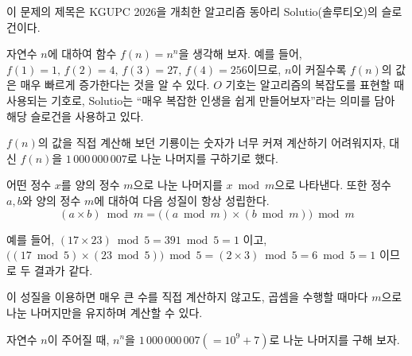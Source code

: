이 문제의 제목은 KGUPC 2026을 개최한 알고리즘 동아리 Solutio(솔루티오)의 슬로건이다.

자연수 $n$에 대하여 함수 $f(n)=n^n$을 생각해 보자. 
예를 들어, $f(1)=1,\, f(2)=4,\, f(3)=27,\, f(4)=256$이므로, $n$이 커질수록 $f(n)$의 값은 매우 빠르게 증가한다는 것을 알 수 있다. 
$O$ 기호는 알고리즘의 복잡도를 표현할 때 사용되는 기호로, Solutio는 ``매우 복잡한 인생을 쉽게 만들어보자''라는 의미를 담아 해당 슬로건을 사용하고 있다.

$f(n)$의 값을 직접 계산해 보던 기룡이는 숫자가 너무 커져 계산하기 어려워지자, 대신 $f(n)$을 $1\,000\,000\,007$로 나눈 나머지를 구하기로 했다.

어떤 정수 $x$를 양의 정수 $m$으로 나눈 나머지를 $x\bmod m$으로 나타낸다. 또한 정수 $a, b$와 양의 정수 $m$에 대하여 다음 성질이 항상 성립한다.
$$(a\times b) \bmod m = \big((a\bmod m)\times(b\bmod m)\big)\bmod m$$

예를 들어, $(17\times 23)\bmod 5 = 391\bmod 5 = 1$ 이고, $\big((17\bmod 5)\times(23\bmod 5)\big) \bmod 5 = (2\times 3)\bmod 5 = 6 \bmod 5 = 1$ 이므로 두 결과가 같다.

이 성질을 이용하면 매우 큰 수를 직접 계산하지 않고도, 곱셈을 수행할 때마다 $m$으로 나눈 나머지만을 유지하며 계산할 수 있다.

자연수 $n$이 주어질 때, $n^n$을 $1\,000\,000\,007(=10^9+7)$로 나눈 나머지를 구해 보자.